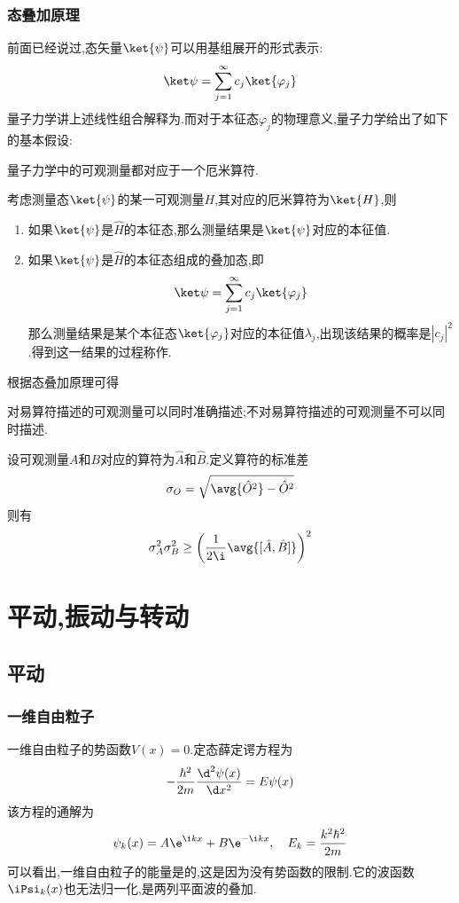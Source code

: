 \documentclass{ctexbook}
\begin{document}
\subsubsection{态叠加原理}
前面已经说过,态矢量$\ket{\psi}$可以用基组展开的形式表示:
\[\ket\psi=\sum_{j=1}^{\infty}c_j\ket{\varphi_j}\]
量子力学讲上述线性组合解释为.而对于本征态$\varphi_j$的物理意义,量子力学给出了如下的基本假设:
\begin{theorem}[可观测量与厄米算符]
    量子力学中的可观测量都对应于一个厄米算符.
\end{theorem}
\begin{theorem}[态叠加原理]
    考虑测量态$\ket{\psi}$的某一可观测量$H$,其对应的厄米算符为$\ket{H}$,则
    \begin{enumerate}[label=\tbf{\alph*.}]
        \item 如果$\ket{\psi}$是$\hat{H}$的本征态,那么测量结果是$\ket{\psi}$对应的本征值.
        \item 如果$\ket{\psi}$是$\hat{H}$的本征态组成的叠加态,即
        \[\ket\psi=\sum_{j=1}^{\infty}c_j\ket{\varphi_j}\]
        那么测量结果是某个本征态$\ket{\varphi_j}$对应的本征值$\lambda_j$,出现该结果的概率是$\left|c_j\right|^2$.得到这一结果的过程称作.
    \end{enumerate}
\end{theorem}
根据态叠加原理可得
\begin{theorem}[对易关系与测量]
    对易算符描述的可观测量可以同时准确描述;不对易算符描述的可观测量不可以同时描述.
\end{theorem}
\begin{theorem}[不确定原理]
    设可观测量$A$和$B$对应的算符为$\hat{A}$和$\hat{B}$.定义算符的标准差
    \[\sigma_{O}=\sqrt{\avg{\hat{O}^2}-\hat{O}^2}\]
    则有
    \[\sigma_A^2\sigma_B^2\geq\left(\dfrac{1}{2\i}\avg{[\hat{A},\hat{B}]}\right)^2\]
\end{theorem}
\section{平动,振动与转动}
\subsection{平动}
\subsubsection{一维自由粒子}
一维自由粒子的势函数$V(x)=0$.定态薛定谔方程为
\[-\dfrac{\hbar^2}{2m}\dfrac{\d^2\psi(x)}{\d x^2}=E\psi(x)\]
该方程的通解为
\[\psi_k(x)=A\e^{\i kx}+B\e^{-\i kx},\quad E_k=\dfrac{k^2\hbar^2}{2m}\]
可以看出,一维自由粒子的能量是的,这是因为没有势函数的限制.它的波函数$\iPsi_k(x)$也无法归一化,是两列平面波的叠加.
\end{document}
